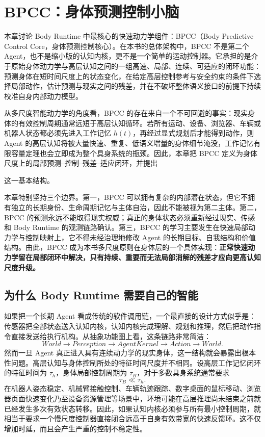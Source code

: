 \chapter{BPCC：身体预测控制小脑}

\begin{chapterlead}
本章讨论 Body Runtime 中最核心的快速动力学组件：BPCC（Body Predictive Control Core，身体预测控制核心）。在本书的总体架构中，BPCC 不是第二个 Agent，也不是缩小版的认知内核，更不是一个简单的运动控制器。它承担的是介于原始身体动力学与高层认知之间的一组高速、局部、连续、可适应的闭环功能：预测身体在短时间尺度上的状态变化，在给定高层控制参考与安全约束的条件下选择局部动作，估计预测与现实之间的残差，并在不破坏整体语义接口的前提下持续校准自身内部动力模型。

从多尺度智能动力学的角度看，BPCC 的存在来自一个不可回避的事实：现实身体的有效控制周期通常远短于高层认知循环。若所有运动、设备、浏览器、车辆或机器人状态都必须先进入工作记忆 $h(t)$，再经过显式规划后才能得到动作，则 Agent 的高层认知将被大量快速、重复、低语义增量的身体细节淹没，工作记忆有限容量定理也会立即成为整个具身系统的瓶颈。因此，本章把 BPCC 定义为身体尺度上的局部预测--控制--残差--适应闭环，并提出
\begin{statementbox}
\centering
{}
\end{statementbox}
这一基本结构。

本章特别坚持三个边界。第一，BPCC 可以拥有复杂的内部潜在状态，但它不拥有独立的长期身份、生命周期记忆与主体自治，因此不能被视为第二主体。第二，BPCC 的预测永远不能取得现实权威；真正的身体状态必须重新经过现实、传感和 Body Runtime 的观测链路确认。第三，BPCC 的学习主要发生在快速局部动力学与控制映射上，它不得未经治理地修改 Agent 的长期目标、自我结构和价值结构。由此，BPCC 成为本书多尺度原则在身体层的一个具体实现：\textbf{正常快速动力学留在局部闭环中解决，只有持续、重要而无法局部消解的残差才应向更高认知尺度升级。}
\end{chapterlead}


\section{为什么 Body Runtime 需要自己的智能}

如果把一个长期 Agent 看成传统的软件调用链，一个最直接的设计方式似乎是：传感器把全部状态送入认知内核，认知内核完成理解、规划和推理，然后把动作指令直接发送给执行机构。从抽象功能图上看，这条链路非常简洁：
\[
World
\rightarrow
Perception
\rightarrow
AgentKernel
\rightarrow
Action
\rightarrow
World.
\]
然而一旦 Agent 真正进入具有连续动力学的现实身体，这一结构就会暴露出根本性问题。高层认知与身体控制所处的特征时间尺度并不相同。设高层工作记忆闭环的特征时间为 $\tau_h$，身体局部控制周期为 $\tau_B$，对于多数具身系统通常要求
\[
\tau_B \ll \tau_h.
\]
在机器人姿态稳定、机械臂接触控制、车辆轨迹跟踪、数字桌面的鼠标移动、浏览器页面快速变化乃至设备资源管理等场景中，环境可能在高层推理尚未结束之前就已经发生多次有效状态转移。因此，如果认知内核必须参与所有最小控制周期，就相当于要求一个慢尺度控制器直接闭合远高于自身有效带宽的快速反馈环。这不仅增加时延，而且会产生严重的控制不稳定性。

